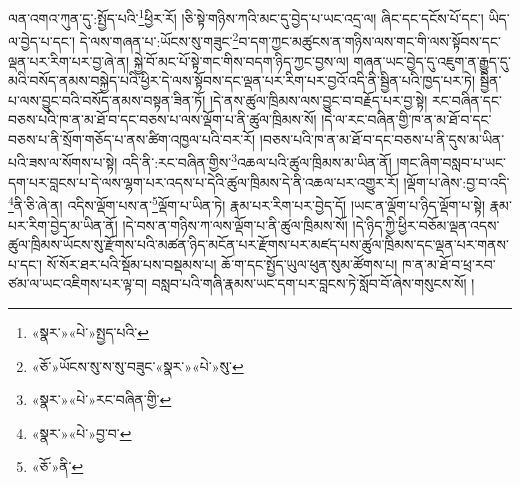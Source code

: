 ལན་འགའ་ཀུན་དུ་:སྤྱོད་པའི་\footnote{«སྣར་»«པེ་»སྤྱད་པའི་}ཕྱིར་རོ། །ཅི་སྟེ་གཉིས་ཀའི་མང་དུ་བྱེད་པ་ཡང་འདྲ་ལ། ཞིང་དང་དངོས་པོ་དང་། ཡིད་ལ་བྱེད་པ་དང་། དེ་ལས་གཞན་པ་:ཡོངས་སུ་གཟུང་\footnote{«ཅོ་»ཡོངས་སུ་ས་སུ་བཟུང་«སྣར་»«པེ་»སུ་}བ་དག་ཀྱང་མཚུངས་ན་གཉིས་ལས་གང་གི་ལས་སྟོབས་དང་ལྡན་པར་རིག་པར་བྱ་ཞེ་ན། སྐྱེ་བོ་མང་པོ་སྟེ་གང་གིས་བདག་ཉིད་ཀྱང་བྱས་ལ། གཞན་ཡང་བྱེད་དུ་འཇུག་ན་རྒྱུད་དུ་མའི་བསོད་ནམས་བསྐྱེད་པའི་ཕྱིར་དེ་ལས་སྟོབས་དང་ལྡན་པར་རིག་པར་བྱའོ་འདི་ནི་སྦྱིན་པའི་ཁྱད་པར་ཏེ། སྦྱིན་པ་ལས་བྱུང་བའི་བསོད་ནམས་བསྟན་ཟིན་ཏོ། །དེ་ནས་ཚུལ་ཁྲིམས་ལས་བྱུང་བ་བརྗོད་པར་བྱ་སྟེ། རང་བཞིན་དང་བཅས་པའི་ཁ་ན་མ་ཐོ་བ་དང་བཅས་པ་ལས་ལྡོག་པ་ནི་ཚུལ་ཁྲིམས་སོ། །དེ་ལ་རང་བཞིན་གྱི་ཁ་ན་མ་ཐོ་བ་དང་བཅས་པ་ནི་སྲོག་གཅོད་པ་ནས་ཚིག་འཁྱལ་པའི་བར་རོ། །བཅས་པའི་ཁ་ན་མ་ཐོ་བ་དང་བཅས་པ་ནི་དུས་མ་ཡིན་པའི་ཟས་ལ་སོགས་པ་སྟེ། འདི་ནི་:རང་བཞིན་གྱིས་\footnote{«སྣར་»«པེ་»རང་བཞིན་གྱི་}འཆལ་པའི་ཚུལ་ཁྲིམས་མ་ཡིན་ནོ། །གང་ཞིག་བསླབ་པ་ཡང་དག་པར་བླངས་པ་དེ་ལས་ལྷག་པར་འདས་པ་དེའི་ཚུལ་ཁྲིམས་དེ་ནི་འཆལ་པར་འགྱུར་རོ། །ལྡོག་པ་ཞེས་:བྱ་བ་འདི་\footnote{«སྣར་»«པེ་»བྱ་བ་}ནི་ཅི་ཞེ་ན། འདིས་ལྡོག་པས་ན་\footnote{«ཅོ་»ནི་}ལྡོག་པ་ཡིན་ཏེ། རྣམ་པར་རིག་པར་བྱེད་དོ། །ཡང་ན་ལྡོག་པ་ཉིད་ལྡོག་པ་སྟེ། རྣམ་པར་རིག་བྱེད་མ་ཡིན་ནོ། །དེ་བས་ན་གཉིས་ཀ་ལས་ལྡོག་པ་ནི་ཚུལ་ཁྲིམས་སོ། །དེ་ཉིད་ཀྱི་ཕྱིར་བཅོམ་ལྡན་འདས་ཚུལ་ཁྲིམས་ཡོངས་སུ་རྫོགས་པའི་མཚན་ཉིད་མངོན་པར་རྫོགས་པར་མཛད་པས་ཚུལ་ཁྲིམས་དང་ལྡན་པར་གནས་པ་དང་། སོ་སོར་ཐར་པའི་སྡོམ་པས་བསྡམས་པ། ཆོ་ག་དང་སྤྱོད་ཡུལ་ཕུན་སུམ་ཚོགས་པ། ཁ་ན་མ་ཐོ་བ་ཕྲ་རབ་ཙམ་ལ་ཡང་འཇིགས་པར་ལྟ་བ། བསླབ་པའི་གཞི་རྣམས་ཡང་དག་པར་བླངས་ཏེ་སློབ་བོ་ཞེས་གསུངས་སོ། །
